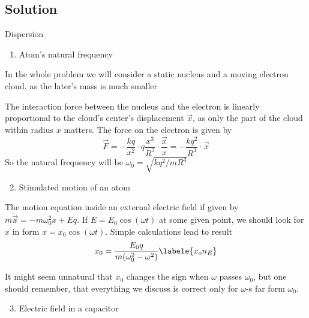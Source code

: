 \subsection*{Solution}

\begin{enumerate}

{\bfseries
\item Dispersion
}

\begin{enumerate}
    \item Atom's natural frequency
\end{enumerate}

\hspace{.5cm}
In the whole problem we will consider a static nucleus
and a moving electron cloud,
as the later's mass is much smaller

\hspace{.5cm}
The interaction force between the nucleus and the electron
is linearly proportional to the cloud's center's displacement $\vec{x}$,
as only the part of the cloud within radius $x$ matters.
The force on the electron is given by
\begin{equation}
    \vec{F} = -\frac{k q}{x^2} \cdot q\frac{x^3}{R^3} \cdot \frac{\vec{x}}{x} =
    -\frac{k q^2}{R^3} \cdot \vec{x}
\end{equation}
So the natural frequency will be $\omega_0 = \sqrt{k q^2 / m R^3}$

\begin{enumerate}
    \setcounter{enumii}{1}
    \item Stimulated motion of an atom
\end{enumerate}

\hspace{.5cm}
The motion equation inside an external electric field if given by
$m\ddot{\vec{x}} = -m \omega_0^2 x + E q$.
If $E = E_0 \cos(\omega t)$ at some given point,
we should look for $x$ in form $x = x_0 \cos(\omega t)$.
Simple calculations lead to result
\begin{equation}
    x_0 = \frac{E_0 q}{m (\omega_0^2 - \omega^2)}
    \labele{x_on_E}
\end{equation}

\hspace{.5cm}
It might seem unnatural that $x_0$ changes the sign
when $\omega$ passes $\omega_0$,
but one should remember, that everything we discuss
is correct only for $\omega$-s far form $\omega_0$.

\begin{enumerate}
    \setcounter{enumii}{2}
    \item Electric field in a capacitor
\end{enumerate}


\end{enumerate}
